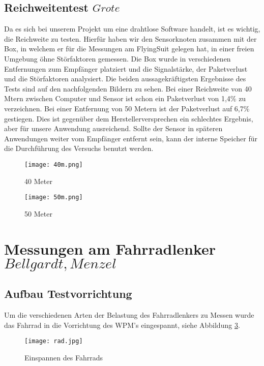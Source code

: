 \subsection{Reichweitentest \(Grote\)}

Da es sich bei unserem Projekt um eine drahtlose Software handelt, ist es wichtig, die Reichweite zu testen. Hierfür haben wir den Sensorknoten zusammen mit der Box, in welchem er für die Messungen am FlyingSuit gelegen hat, in einer freien Umgebung öhne Störfaktoren gemessen. Die Box wurde in verschiedenen Entfernungen zum Empfänger platziert und die Signalstärke, der Paketverlust und die Störfaktoren analysiert. Die beiden aussagekräftigsten Ergebnisse des Tests sind auf den nachfolgenden Bildern zu sehen.
Bei einer Reichweite von 40 Mtern zwischen Computer und Sensor ist schon ein Paketverlust von 1,4\% zu verzeichnen. Bei einer Entfernung von 50 Metern ist der Paketverlust auf 6,7\% gestiegen. Dies ist gegenüber dem Herstellerversprechen ein schlechtes Ergebnis, aber für unsere Anwendung ausreichend. Sollte der Sensor in späteren Anwendungen weiter vom Empfänger entfernt sein, kann der interne Speicher für die Durchführung des Versuchs benutzt werden.

\begin{figure}[h]
    \begin{center}
        \texttt{[image: 40m.png]}
        \caption[Reichweitentest 40 Meter]{40 Meter
        }
        \label{fig:40m}
    \end{center}
\end{figure}

\begin{figure}[h]
    \begin{center}
        \texttt{[image: 50m.png]}
        \caption[Reichweitentest 50 Meter]{50 Meter
        }
        \label{fig:50m}
    \end{center}
\end{figure}

\section{Messungen am Fahrradlenker \(Bellgardt, Menzel\)}
\subsection{Aufbau Testvorrichtung}
Um die verschiedenen Arten der Belastung des Fahrradlenkers zu Messen wurde das Fahrrad in die Vorrichtung des WPM's eingespannt, siehe Abbildung \ref{fig:rad}.
\begin{figure}[htbp]
    \begin{center}
        \texttt{[image: rad.jpg]}
        \caption[Einspannen des Fahrrads (Abbildungsverzeichnis)]{Einspannen des Fahrrads}
        
        \label{fig:rad}
    \end{center}
\end{figure}

